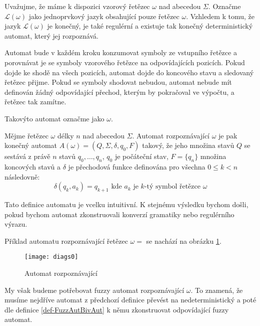 \documentclass[a4paper,10pt]{article}
\begin{document}
Uvažujme, že máme k dispozici vzorový řetězec $\omega$ nad abecedou $\Sigma$. Označme $\mathcal{L}(\omega)$ jako jednoprvkový jazyk obsahující pouze řetězec $\omega$. Vzhledem k tomu, že jazyk $\mathcal{L}(\omega)$ je konečný, je také regulérní a existuje tak konečný deterministický automat, který jej rozpoznává.

Automat bude v každém kroku konzumovat symboly ze vstupního řetězce a porovnávat je se symboly vzorového řetězce na odpovídajících pozicích. Pokud dojde ke shodě na všech pozicích, automat dojde do koncového stavu a sledovaný řetězec přijme. Pokud se symboly shodovat nebudou, automat nebude mít definován žádný odpovídající přechod, kterým by pokračoval ve výpočtu, a řetězec tak zamítne. 

Takovýto automat označme jako  $\omega$.
\begin{definition}
  Mějme řetězec $\omega$ délky $n$ nad abecedou $\Sigma$. Automat rozpoznávající $\omega$ je pak konečný automat $A(\omega) = ( Q, \Sigma, \delta, q_0, F )$ takový, že jeho množina stavů $Q$ se sestává z právě $n$ stavů $q_0, \dots, q_n$, $q_0$ je počáteční stav, $F = \{ q_n \}$ množina koncových stavů a $\delta$ je přechodová funkce definována pro všechna $0 \leq k < n$ následovně:
  $$
    \delta(q_{k}, a_k) = q_{k+1} \text{ kde $a_k$ je $k$-tý symbol řetězce $\omega$}
  $$
\end{definition}

Tato definice automatu je vcelku intuitivní. K stejnému výsledku bychom došli, pokud bychom automat zkonstruovali konverzí gramatiky nebo regulérního výrazu. 

\begin{example}
 Příklad automatu rozpoznávající řetězec $\omega = $  se nachází na obrázku \ref{diag-AutRozpHell}.  

  \begin{figure}
    \texttt{[image: diags0]}
    \caption{Automat rozpoznávající } \label{diag-AutRozpHell}
  \end{figure}
\end{example}

My však budeme potřebovat fuzzy automat rozpoznávající $\omega$. To znamená, že musíme nejdříve automat z předchozí definice převést na nedeterministický a poté dle definice \ref{def-FuzzAutBivAut} k němu zkonstruovat odpovídající fuzzy automat.
\end{document}
